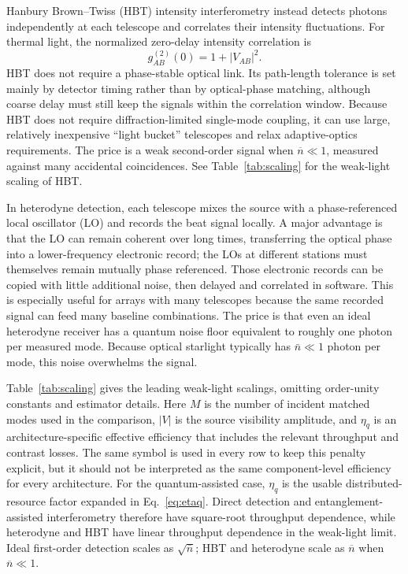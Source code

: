 \documentclass[]{spie}
\newcommand{\nbar}{\overline{n}}
\begin{document}
Hanbury Brown--Twiss (HBT) intensity interferometry instead detects photons independently at each telescope and correlates their intensity fluctuations. For thermal light, the normalized zero-delay intensity correlation is
\begin{equation}
    g^{(2)}_{AB}(0)=1+|V_{AB}|^2.
    \label{eq:hbt}
\end{equation}
HBT does not require a phase-stable optical link. Its path-length tolerance is set mainly by detector timing rather than by optical-phase matching, although coarse delay must still keep the signals within the correlation window. Because HBT does not require diffraction-limited single-mode coupling, it can use large, relatively inexpensive ``light bucket'' telescopes and relax adaptive-optics requirements. The price is a weak second-order signal when $\nbar\ll1$, measured against many accidental coincidences.\cite{HanburyBrown1956,Tsang2011} See Table~\ref{tab:scaling} for the weak-light scaling of HBT.

In heterodyne detection, each telescope mixes the source with a phase-referenced local oscillator (LO) and records the beat signal locally. A major advantage is that the LO can remain coherent over long times, transferring the optical phase into a lower-frequency electronic record; the LOs at different stations must themselves remain mutually phase referenced. Those electronic records can be copied with little additional noise, then delayed and correlated in software. This is especially useful for arrays with many telescopes because the same recorded signal can feed many baseline combinations.\cite{irelandmonnier2014} The price is that even an ideal heterodyne receiver has a quantum noise floor equivalent to roughly one photon per measured mode. Because optical starlight typically has \(\bar n\ll1\) photon per mode, this noise overwhelms the signal.

Table~\ref{tab:scaling} gives the leading weak-light scalings, omitting order-unity constants and estimator details. Here $M$ is the number of incident matched modes used in the comparison, $|V|$ is the source visibility amplitude, and $\eta_q$ is an architecture-specific effective efficiency that includes the relevant throughput and contrast losses. The same symbol is used in every row to keep this penalty explicit, but it should not be interpreted as the same component-level efficiency for every architecture. For the quantum-assisted case, $\eta_q$ is the usable distributed-resource factor expanded in Eq.~\ref{eq:etaq}. Direct detection and entanglement-assisted interferometry therefore have square-root throughput dependence, while heterodyne and HBT have linear throughput dependence in the weak-light limit. Ideal first-order detection scales as $\sqrt{\nbar}$; HBT and heterodyne scale as $\nbar$ when $\nbar\ll1$.
\end{document}

